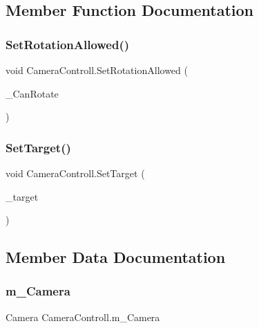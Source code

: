 \subsection{Member Function Documentation}
\mbox{\label{class_camera_controll_a87cbabdae595f2213683728da18bde66}} 
\subsubsection{\texorpdfstring{SetRotationAllowed()}{SetRotationAllowed()}}
{\footnotesize\ttfamily void Camera\+Controll.\+Set\+Rotation\+Allowed (\begin{DoxyParamCaption}\item[{bool}]{\+\_\+\+Can\+Rotate }\end{DoxyParamCaption})}

\mbox{\label{class_camera_controll_a447c8b3d7830c882459aa0f948326676}} 
\subsubsection{\texorpdfstring{SetTarget()}{SetTarget()}}
{\footnotesize\ttfamily void Camera\+Controll.\+Set\+Target (\begin{DoxyParamCaption}\item[{Game\+Object}]{\+\_\+target }\end{DoxyParamCaption})}



\subsection{Member Data Documentation}
\mbox{\label{class_camera_controll_a15df1b4f5208f83a9f1332ef79ad4c81}} 
\subsubsection{\texorpdfstring{m\_Camera}{m\_Camera}}
{\footnotesize\ttfamily Camera Camera\+Controll.\+m\+\_\+\+Camera}

